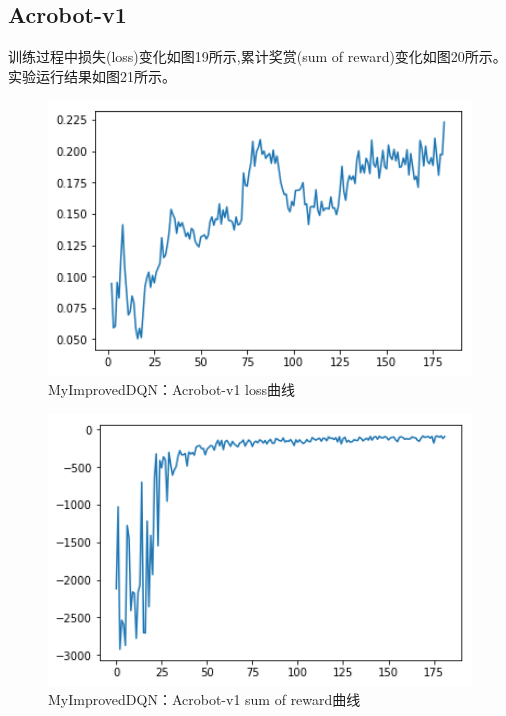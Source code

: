 \documentclass[a4paper,UTF8]{article}
\theoremstyle{definition}
\begin{document}
    \subsection{Acrobot-v1}
    训练过程中损失(loss)变化如图19所示,累计奖赏(sum of reward)变化如图20所示。实验运行结果如图21所示。
    \begin{center}
    \begin{figure}[H]
          \centering
          \includegraphics[width=12cm]{25.png}
          \caption{MyImprovedDQN：Acrobot-v1 loss曲线}
          \label{fig:2.3}
    \end{figure}
    \end{center}
    \begin{center}
    \begin{figure}[H]
          \centering
          \includegraphics[width=12cm]{26.png}
          \caption{MyImprovedDQN：Acrobot-v1 sum of reward曲线}
          \label{fig:2.3}
    \end{figure}
    \end{center}
\end{document}
